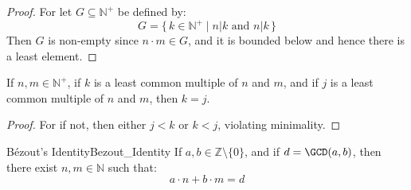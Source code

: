 \documentclass{article}                                                        %
\begin{document}
            \begin{proof}
                For let $G\subseteq\mathbb{N}^{+}$ be defined by:
                \begin{equation}
                    G=\{\,k\in\mathbb{N}^{+}\;|\;n|k\textrm{ and }n|k\,\}
                \end{equation}
                Then $G$ is non-empty since $n\cdot{m}\in{G}$, and it is bounded
                below and hence there is a least element.
            \end{proof}
            \begin{theorem}
                \label{thm:LCM_Unique}%
                If $n,m\in\mathbb{N}^{+}$, if $k$ is a least common multiple of $n$
                and $m$, and if $j$ is a least common multiple of $n$ and $m$, then
                $k=j$.
            \end{theorem}
            \begin{proof}
                For if not, then either $j<k$ or $k<j$, violating minimality.
            \end{proof}
            \begin{ftheorem}{B\'{e}zout's Identity}{Bezout_Identity}
                If $a,b\in\mathbb{Z}\setminus\{0\}$, and if $d=\GCD(a,b)$, then
                there exist $n,m\in\mathbb{N}$ such that:
                \begin{equation}
                    a\cdot{n}+b\cdot{m}=d
                \end{equation}
            \end{ftheorem}
\end{document}
